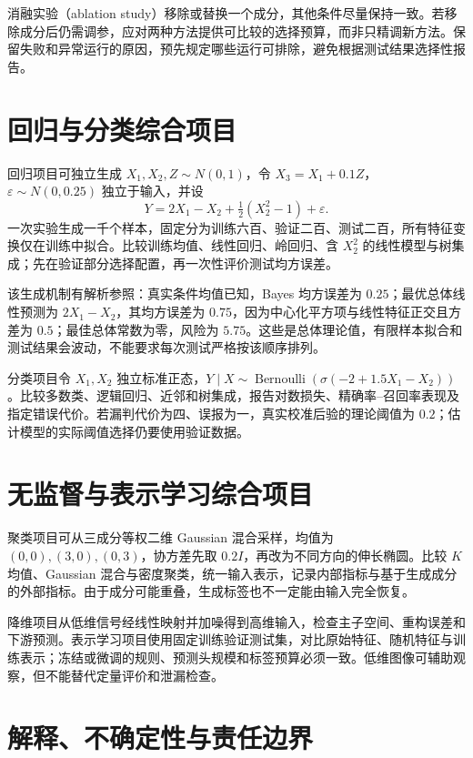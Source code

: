 \documentclass[UTF8,12pt,a4paper,fontset=fandol]{ctexbook}
\begin{document}
消融实验（ablation study）移除或替换一个成分，其他条件尽量保持一致。若移除成分后仍需调参，应对两种方法提供可比较的选择预算，而非只精调新方法。保留失败和异常运行的原因，预先规定哪些运行可排除，避免根据测试结果选择性报告。

\section{回归与分类综合项目}

回归项目可独立生成 $X_1,X_2,Z\sim N(0,1)$，令 $X_3=X_1+0.1Z$，$\varepsilon\sim N(0,0.25)$ 独立于输入，并设
\begin{equation}
 Y=2X_1-X_2+\tfrac12(X_2^2-1)+\varepsilon.
 \label{eq:ml-regression-project}
\end{equation}
一次实验生成一千个样本，固定分为训练六百、验证二百、测试二百，所有特征变换仅在训练中拟合。比较训练均值、线性回归、岭回归、含 $X_2^2$ 的线性模型与树集成；先在验证部分选择配置，再一次性评价测试均方误差。

该生成机制有解析参照：真实条件均值已知，Bayes 均方误差为 $0.25$；最优总体线性预测为 $2X_1-X_2$，其均方误差为 $0.75$，因为中心化平方项与线性特征正交且方差为 $0.5$；最佳总体常数为零，风险为 $5.75$。这些是总体理论值，有限样本拟合和测试结果会波动，不能要求每次测试严格按该顺序排列。

分类项目令 $X_1,X_2$ 独立标准正态，$Y\mid X\sim\operatorname{Bernoulli}(\sigma(-2+1.5X_1-X_2))$。比较多数类、逻辑回归、近邻和树集成，报告对数损失、精确率--召回率表现及指定错误代价。若漏判代价为四、误报为一，真实校准后验的理论阈值为 $0.2$；估计模型的实际阈值选择仍要使用验证数据。

\section{无监督与表示学习综合项目}

聚类项目可从三成分等权二维 Gaussian 混合采样，均值为 $(0,0),(3,0),(0,3)$，协方差先取 $0.2I$，再改为不同方向的伸长椭圆。比较 $K$ 均值、Gaussian 混合与密度聚类，统一输入表示，记录内部指标与基于生成成分的外部指标。由于成分可能重叠，生成标签也不一定能由输入完全恢复。

降维项目从低维信号经线性映射并加噪得到高维输入，检查主子空间、重构误差和下游预测。表示学习项目使用固定训练验证测试集，对比原始特征、随机特征与训练表示；冻结或微调的规则、预测头规模和标签预算必须一致。低维图像可辅助观察，但不能替代定量评价和泄漏检查。

\section{解释、不确定性与责任边界}
\end{document}
